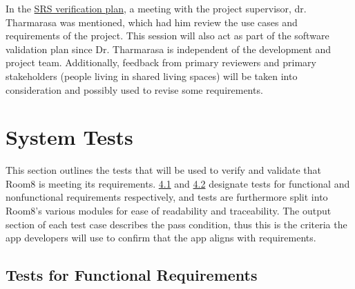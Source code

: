 \documentclass[12pt, titlepage]{article}
\begin{document}



In the \hyperref[section:SRSVerificationPlan]{SRS verification plan}, a meeting with the project supervisor, dr. Tharmarasa was mentioned, which had him review the use cases and requirements of the project. This session will also act as part of the software validation plan since Dr. Tharmarasa is independent of the development and project team. Additionally, feedback from primary reviewers and primary stakeholders (people living in shared living spaces) will be taken into consideration and possibly used to revise some requirements.    
\section{System Tests}
\label{section:systemTests}

This section outlines the tests that will be used to verify and validate that Room8 is meeting its requirements. \hyperref[subsec:testsForFunc]{4.1} and \hyperref[subsec:testsForNonFunc]{4.2} designate tests for functional and nonfunctional requirements respectively, and tests are furthermore split into Room8's various modules for ease of readability and traceability. The output section of each test case describes the pass condition, thus this is the criteria the app developers will use to confirm that the app aligns with requirements. 

\subsection{Tests for Functional Requirements}
\label{subsec:testsForFunc}
\end{document}
